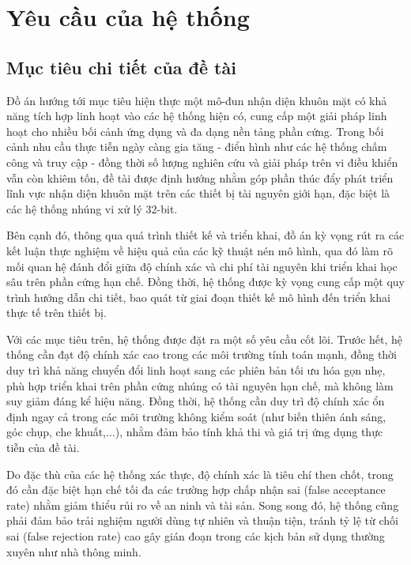 \section{Yêu cầu của hệ thống}
\subsection{Mục tiêu chi tiết của đề tài}
Đồ án hướng tới mục tiêu hiện thực một mô-đun nhận diện khuôn mặt có khả năng tích hợp linh hoạt vào các hệ thống hiện có, cung cấp một giải pháp linh hoạt cho nhiều bối cảnh ứng dụng và đa dạng nền tảng phần cứng. Trong bối cảnh nhu cầu thực tiễn ngày càng gia tăng - điển hình như các hệ thống chấm công và truy cập\cite{17_10128985} - đồng thời số lượng nghiên cứu và giải pháp trên vi điều khiển vẫn còn khiêm tốn\cite{35_10457480}, đề tài được định hướng nhằm góp phần thúc đẩy phát triển lĩnh vực nhận diện khuôn mặt trên các thiết bị tài nguyên giới hạn, đặc biệt là các hệ thống nhúng vi xử lý 32-bit. 

Bên cạnh đó, thông qua quá trình thiết kế và triển khai, đồ án kỳ vọng rút ra các kết luận thực nghiệm về hiệu quả của các kỹ thuật nén mô hình, qua đó làm rõ mối quan hệ đánh đổi giữa độ chính xác và chi phí tài nguyên khi triển khai học sâu trên phần cứng hạn chế. Đồng thời, hệ thống được kỳ vọng cung cấp một quy trình hướng dẫn chi tiết, bao quát từ giai đoạn thiết kế mô hình đến triển khai thực tế trên thiết bị.

Với các mục tiêu trên, hệ thống được đặt ra một số yêu cầu cốt lõi. Trước hết, hệ thống cần đạt độ chính xác cao trong các môi trường tính toán mạnh, đồng thời duy trì khả năng chuyển đổi linh hoạt sang các phiên bản tối ưu hóa gọn nhẹ, phù hợp triển khai trên phần cứng nhúng có tài nguyên hạn chế, mà không làm suy giảm đáng kể hiệu năng. Đồng thời, hệ thống cần duy trì độ chính xác ổn định ngay cả trong các môi trường không kiểm soát (như biến thiên ánh sáng, góc chụp, che khuất,$\ldots$), nhằm đảm bảo tính khả thi và giá trị ứng dụng thực tiễn của đề tài.

Do đặc thù của các hệ thống xác thực, độ chính xác là tiêu chí then chốt, trong đó cần đặc biệt hạn chế tối đa các trường hợp chấp nhận sai (false acceptance rate) nhằm giảm thiểu rủi ro về an ninh và tài sản. Song song đó, hệ thống cũng phải đảm bảo trải nghiệm người dùng tự nhiên và thuận tiện, tránh tỷ lệ từ chối sai (false rejection rate) cao gây gián đoạn trong các kịch bản sử dụng thường xuyên như nhà thông minh.

